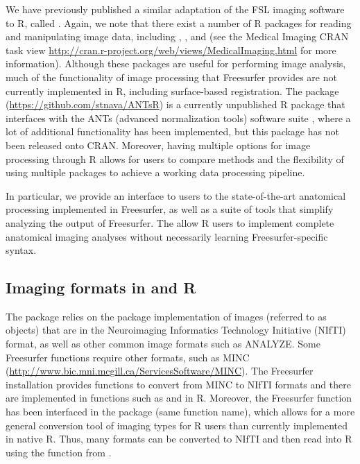 We have previously published a similar adaptation of the FSL imaging
software \citep{jenkinson_fsl_2012} to R, called 
\citep{muschelli2015fslr}. Again, we note that there exist a number of R
packages for reading and manipulating image data, including
 \citep{bordier_temporal_2011}, 
\citep{modat_rniftyreg:_2013}, and 
\citep{tabelow_statistical_2011} (see the Medical Imaging CRAN task view
\url{http://cran.r-project.org/web/views/MedicalImaging.html} for more
information). Although these packages are useful for performing image
analysis, much of the functionality of image processing that Freesurfer
provides are not currently implemented in R, including surface-based
registration. The  package
(\url{https://github.com/stnava/ANTsR}) is a currently unpublished R
package that interfaces with the ANTs (advanced normalization tools)
software suite \citep{avants_reproducible_2011}, where a lot of
additional functionality has been implemented, but this package has not
been released onto CRAN. Moreover, having multiple options for image
processing through R allows for users to compare methods and the
flexibility of using multiple packages to achieve a working data
processing pipeline.

In particular, we provide an interface to users to the state-of-the-art
anatomical processing implemented in Freesurfer, as well as a suite of
tools that simplify analyzing the output of Freesurfer. The
 allow R users to implement complete anatomical imaging
analyses without necessarily learning Freesurfer-specific syntax.

\subsection{\texorpdfstring{Imaging formats in  and
R}{Imaging formats in  and R}}\label{imaging-formats-in-and-r}

The  package relies on the 
\citep{whitcher_working_2011} package implementation of images (referred
to as  objects) that are in the Neuroimaging Informatics
Technology Initiative (NIfTI) format, as well as other common image
formats such as ANALYZE. Some Freesurfer functions require other
formats, such as MINC
(\url{http://www.bic.mni.mcgill.ca/ServicesSoftware/MINC}). The
Freesurfer installation provides functions to convert from MINC to NIfTI
formats and there are implemented in functions such as 
and  in R. Moreover, the  Freesurfer
function has been interfaced in the  package (same
function name), which allows for a more general conversion tool of
imaging types for R users than currently implemented in native R. Thus,
many formats can be converted to NIfTI and then read into R using the
 function from .

